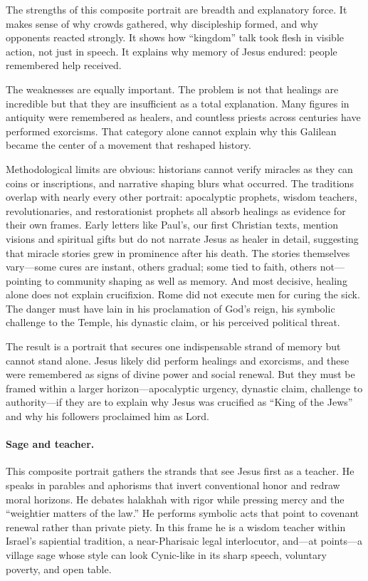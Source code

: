 The strengths of this composite portrait are breadth and explanatory force.
It makes sense of why crowds gathered, why discipleship formed, and why opponents reacted strongly.
It shows how “kingdom” talk took flesh in visible action, not just in speech.
It explains why memory of Jesus endured: people remembered help received.

The weaknesses are equally important.
The problem is not that healings are incredible but that they are insufficient as a total explanation.
Many figures in antiquity were remembered as healers, and countless priests across centuries have performed exorcisms.
That category alone cannot explain why this Galilean became the center of a movement that reshaped history.

Methodological limits are obvious: historians cannot verify miracles as they can coins or inscriptions, and narrative shaping blurs what occurred.
The traditions overlap with nearly every other portrait: apocalyptic prophets, wisdom teachers, revolutionaries, and restorationist prophets all absorb healings as evidence for their own frames.
Early letters like Paul’s, our first Christian texts, mention visions and spiritual gifts but do not narrate Jesus as healer in detail, suggesting that miracle stories grew in prominence after his death.
The stories themselves vary—some cures are instant, others gradual; some tied to faith, others not—pointing to community shaping as well as memory.
And most decisive, healing alone does not explain crucifixion.
Rome did not execute men for curing the sick.
The danger must have lain in his proclamation of God’s reign, his symbolic challenge to the Temple, his dynastic claim, or his perceived political threat.

The result is a portrait that secures one indispensable strand of memory but cannot stand alone.
Jesus likely did perform healings and exorcisms, and these were remembered as signs of divine power and social renewal.
But they must be framed within a larger horizon—apocalyptic urgency, dynastic claim, challenge to authority—if they are to explain why Jesus was crucified as “King of the Jews” and why his followers proclaimed him as Lord.

\paragraph{Sage and teacher.}

This composite portrait gathers the strands that see Jesus first as a teacher.
He speaks in parables and aphorisms that invert conventional honor and redraw moral horizons.
He debates halakhah with rigor while pressing mercy and the “weightier matters of the law.”
He performs symbolic acts that point to covenant renewal rather than private piety.
In this frame he is a wisdom teacher within Israel’s sapiential tradition, a near-Pharisaic legal interlocutor, and—at points—a village sage whose style can look Cynic-like in its sharp speech, voluntary poverty, and open table.

